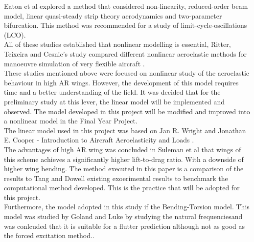 \documentclass[11pt]{article}
\begin{document}
Eaton et al \cite{EatonNumericalWings} explored a method that considered non-linearity, reduced-order beam model, linear quasi-steady strip theory aerodynamics and two-parameter bifurcation. This method was recommended for a study of limit-cycle-oscillations (LCO).\\

All of these studies established that nonlinear modelling is essential, Ritter, Teixeira and Cesnic's study compared different nonlinear aeroelastic methods for manoeuvre simulation of very flexible aircraft \cite{Ritter2018ComparisonAircraft}.\\

These studies mentioned above were focused on nonlinear study of the aeroelastic behaviour in high AR wings. However, the development of this model requires time and a better understanding of the field. It was decided that for the preliminary study at this lever, the linear model will be implemented and observed. The model developed in this project will be modified and improved into a nonlinear model in the Final Year Project.\\

The linear model used in this project was based on Jan R. Wright and Jonathan E. Cooper - Introduction to Aircraft Aeroelasticity and Loads \cite{Wright2015INTRODUCTIONLOADS}.\\

The advantages of high AR wing was concluded in Suleman et al \cite{Suleman2017Non-linearVariation} that wings of this scheme achieves a significantly higher lift-to-drag ratio. With a downside of higher wing bending. The method executed in this paper is a comparison of the results to Tang and Dowell\cite{Tang2001ExperimentalWings} existing exoerimental results to benchmark the computational method developed. This is the practice that will be adopted for this project.\\

Furthermore, the model adopted in this study if the Bending-Torsion model. This model was studied by Goland and Luke \cite{Goland1949AWings} by studying the natural frequenciesand was conlcuded that it is suitable for a flutter prediction although not as good as the forced excitation method.. 



\end{document}
